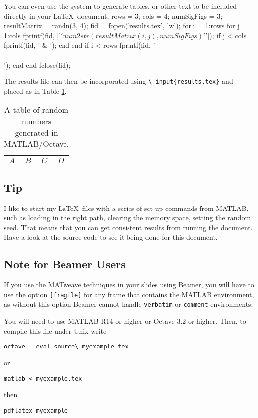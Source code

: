\documentclass{article}
\newenvironment{matlabv}{\verbatim}{\endverbatim}
\begin{document}
You can even use the system to generate tables, or other text to be
included directly in your \LaTeX\ document,
\begin{matlabv}
rows = 3;
cols = 4;
numSigFigs = 3;
resultMatrix = randn(3, 4); %
fid = fopen('results.tex', 'w');
for i = 1:rows
  for j = 1:cols
    fprintf(fid, ['$' num2str(resultMatrix(i, j), numSigFigs) '$']);
    if j < cols
      fprintf(fid, ' & ');
    end
  end
  if i < rows
    fprintf(fid, '\\\\\n');
  end 
end
fclose(fid);
\end{matlabv}

The results file can then be incorporated using \texttt{\textbackslash
  input\{results.tex\}} and placed as in Table \ref{table:one}.
\begin{table}
\caption{A table of random numbers generated in MATLAB/Octave.}\label{table:one}
\begin{center}
\begin{tabular}{c|c|c|c}
$A$ & $B$ & $C$ & $D$ \\
\hline

\end{tabular}
\end{center}
\end{table}

\subsection{Tip}

I like to start my \LaTeX\ files with a series of set up commands from
MATLAB, such as loading in the right path, clearing the memory space,
setting the random seed. That means that you can get consistent
results from running the document. Have a look at the source code to
see it being done for this document.

\subsection{Note for Beamer Users}

If you use the MATweave techniques in your slides using Beamer, you
will have to use the option \texttt{[fragile]} for any frame that
contains the MATLAB environment, as without this option Beamer cannot
handle \texttt{verbatim} or \texttt{comment} environments.

You will need to use MATLAB R14 or higher or Octave 3.2 or higher. Then, to
compile this file under Unix write
\begin{verbatim}
octave --eval source\ myexample.tex
\end{verbatim}
or 
\begin{verbatim}
matlab < myexample.tex
\end{verbatim}
then
\begin{verbatim}
pdflatex myexample
\end{verbatim}
\end{document}
